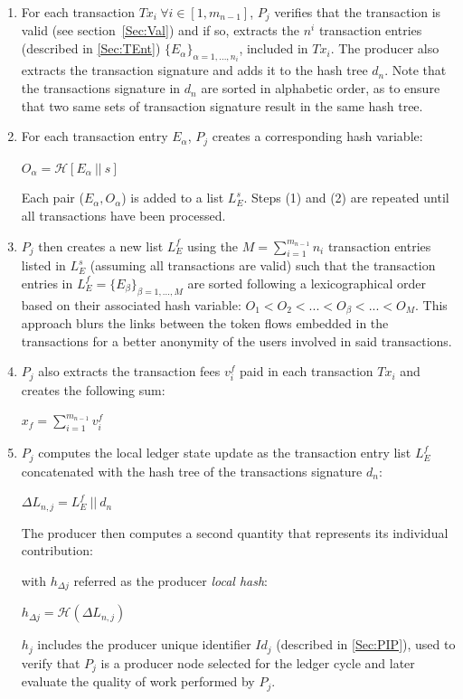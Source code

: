 \begin{enumerate}
\item For each transaction $Tx_i~\forall i\in [1,m_{n-1}]$, $P_j$ verifies that the transaction is valid (see section~\ref{Sec:Val}) and if so, extracts the $n^i$ transaction entries (described in \ref{Sec:TEnt}) $\{E_\alpha\}_{\alpha=1,...,n_i}$, included in $Tx_i$. The producer also extracts the transaction signature and adds it to the hash tree $d_n$. Note that the transactions signature in $d_n$ are sorted in alphabetic order, as to ensure that two same sets of transaction signature result in the same hash tree.

\item For each transaction entry $E_\alpha$, $P_j$ creates a corresponding hash variable: 

\begin{center}
$O_\alpha = \mathcal{H}[E_\alpha~||~s]$
\end{center}

Each pair ($E_\alpha,O_\alpha$) is added to a list $L^s_E$. Steps (1) and (2) are repeated until all transactions have been processed.

\item	$P_j$ then creates a new list $L^f_E$ using the $M=\sum_{i=1}^{m_{n-1}}n_i$ transaction entries listed in $L^s_E$ (assuming all transactions are valid) such that the transaction entries in $L^f_E = \{E_\beta\}_{\beta=1,...,M}$ are sorted following a lexicographical order based on their associated hash variable: $O_1 < O_2 < ... < O_\beta < ... < O_M$. \textcolor{bulg}{This approach blurs the links between the token flows embedded in the transactions for a better anonymity of the users involved in said transactions.} 

\item $P_j$ also extracts the transaction fees $v^{f}_i$ paid in each transaction $Tx_i$ and creates the following sum:
\begin{center}
$x_f = \sum_{i=1}^{m_{n-1}} v^{f}_i$
\end{center}

\item $P_j$ computes the local ledger state update as the transaction entry list $L^f_E$ concatenated with the hash tree of the transactions signature $d_n$: 
\begin{center}
$\Delta L_{n,j} = L^f_E~||~d_n $ %
\end{center}

The producer then computes a second quantity that represents its individual contribution:
\begin{center}
\end{center}
with $h_{\Delta j}$ referred as the producer \textit{local hash}:  
\begin{center}
$h_{\Delta j} = \mathcal{H}(\Delta L_{n,j})$ 
\end{center}
$h_j$ includes the producer unique identifier $Id_j$ (described in \ref{Sec:PIP}), used to verify that $P_j$ is a producer node selected for the ledger cycle and later evaluate the quality of work performed by $P_j$. 


\end{enumerate}
